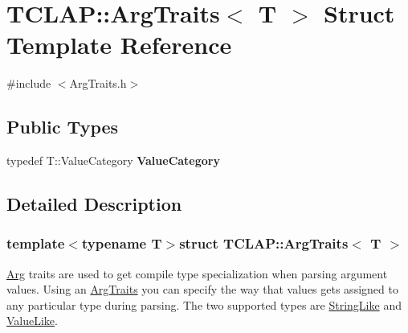 \hypertarget{struct_t_c_l_a_p_1_1_arg_traits}{\section{T\+C\+L\+A\+P\+:\+:Arg\+Traits$<$ T $>$ Struct Template Reference}
\label{struct_t_c_l_a_p_1_1_arg_traits}
}


{\ttfamily \#include $<$Arg\+Traits.\+h$>$}

\subsection*{Public Types}
\begin{DoxyCompactItemize}
\item 
\hypertarget{struct_t_c_l_a_p_1_1_arg_traits_a346532973520fc820d6b3e5406dfa8f6}{typedef T\+::\+Value\+Category {\bfseries Value\+Category}}\label{struct_t_c_l_a_p_1_1_arg_traits_a346532973520fc820d6b3e5406dfa8f6}

\end{DoxyCompactItemize}


\subsection{Detailed Description}
\subsubsection*{template$<$typename T$>$struct T\+C\+L\+A\+P\+::\+Arg\+Traits$<$ T $>$}

\hyperlink{class_t_c_l_a_p_1_1_arg}{Arg} traits are used to get compile type specialization when parsing argument values. Using an \hyperlink{struct_t_c_l_a_p_1_1_arg_traits}{Arg\+Traits} you can specify the way that values gets assigned to any particular type during parsing. The two supported types are \hyperlink{struct_t_c_l_a_p_1_1_string_like}{String\+Like} and \hyperlink{struct_t_c_l_a_p_1_1_value_like}{Value\+Like}. 